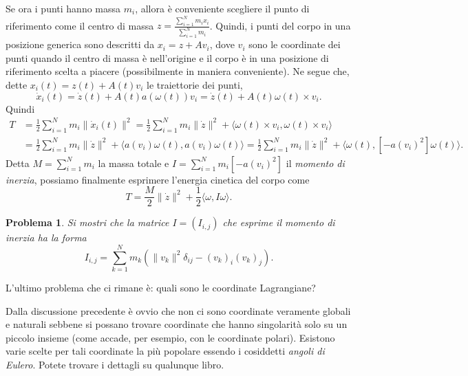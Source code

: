 \documentclass{amsart}
\numberwithin{equation}{section}
\newtheorem{pro}{Problema}
\begin{document}
Se ora i punti hanno massa $m_i$, allora \`e conveniente scegliere il punto di riferimento come il centro di massa $z=\frac{\sum_{i=1}^N m_ix_i}{\sum_{i=1}^N m_i}$. Quindi, i punti del corpo in una posizione generica sono descritti da $x_i=z+Av_i$, dove  $v_i$ sono le coordinate dei punti quando il centro di massa \`e nell'origine e il corpo \`e in una posizione di riferimento scelta a piacere (possibilmente in maniera conveniente). Ne segue che, dette $x_i(t)=z(t)+A(t)v_i$ le traiettorie dei punti,
\[
\dot x_i(t)=\dot z(t)+A(t)a(\omega(t))v_i=\dot z(t)+A(t)\omega(t)\times v_i.
\]
Quindi
\[
\begin{split}
T&=\frac 12\sum_{i=1}^Nm_i\|\dot x_i(t)\|^2=\frac 12\sum_{i=1}^Nm_i\|\dot z\|^2+\langle \omega(t)\times v_i, \omega(t)\times v_i\rangle\\
&=\frac 12\sum_{i=1}^Nm_i\|\dot z\|^2+\langle a(v_i) \omega(t), a(v_i)\omega(t)\rangle=\frac 12\sum_{i=1}^Nm_i\|\dot z\|^2+\langle  \omega(t),[- a(v_i)^2]\omega(t)\rangle.
\end{split}
\]
Detta $M=\sum_{i=1}^Nm_i$ la massa totale e $I=\sum_{i=1}^Nm_i[- a(v_i)^2]$ il {\em momento di inerzia}, possiamo finalmente esprimere l'energia cinetica del corpo come
\[
T=\frac M2 \|\dot z\|^2+\frac 12 \langle \omega, I\omega\rangle.
\]
\begin{pro} Si mostri che la matrice $I=(I_{i,j})$ che esprime il momento di inerzia  ha la forma
\[
I_{i,j}=\sum_{k=1}^Nm_k \left(\|v_k\|^2\delta_{ij}-(v_k)_i(v_k)_j\right).
\]
\end{pro}
L'ultimo problema che ci rimane \`e: quali sono le coordinate Lagrangiane?  

Dalla discussione precedente \`e ovvio che non ci sono coordinate veramente globali e naturali sebbene si possano trovare coordinate che hanno singolarit\`a solo su un piccolo insieme (come accade, per esempio, con le coordinate polari). Esistono varie scelte per tali coordinate la pi\`u popolare essendo i cosiddetti {\em angoli di Eulero}. Potete trovare i dettagli su qualunque libro.


\end{document}
